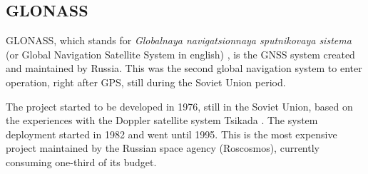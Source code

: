 \subsection{GLONASS}






GLONASS, which stands for \textit{Globalnaya navigatsionnaya sputnikovaya sistema} (or Global Navigation Satellite System in english) \cite{glonass}, is the GNSS system created and maintained by Russia. This was the second global navigation system to enter operation, right after GPS, still during the Soviet Union period.

The project started to be developed in 1976, still in the Soviet Union, based on the experiences with the Doppler satellite system Tsikada \cite{hofmann-wellenhof2007}. The system deployment started in 1982 and went until 1995. This is the most expensive project maintained by the Russian space agency (Roscosmos), currently consuming one-third of its budget.

